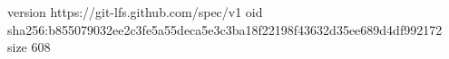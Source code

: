 version https://git-lfs.github.com/spec/v1
oid sha256:b855079032ee2c3fe5a55deca5e3c3ba18f22198f43632d35ee689d4df992172
size 608
